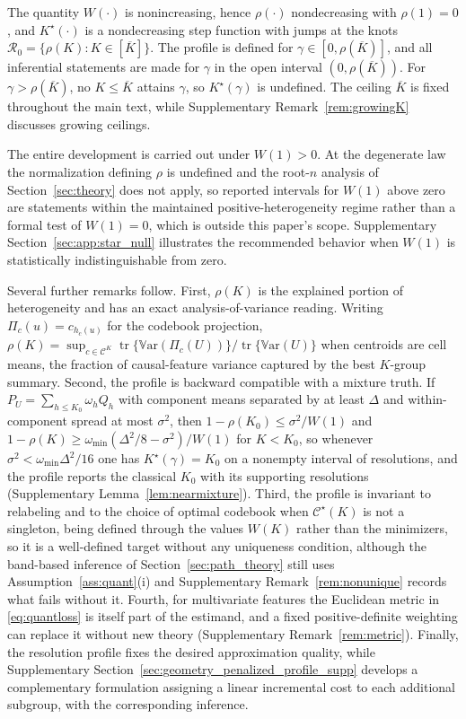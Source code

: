 \documentclass[11pt]{article}
\newcommand{\Var}{\mathbb V\mathrm{ar}}
\newcommand{\tr}{\operatorname{tr}}
\newcommand{\calC}{\mathcal C}
\begin{document}
The quantity $W(\cdot)$ is nonincreasing, hence $\rho(\cdot)$ nondecreasing with $\rho(1)=0$, and $K^\star(\cdot)$ is a nondecreasing step function with jumps at the knots $\mathcal R_0=\{\rho(K):K\in[\overline K]\}$. The profile is defined for $\gamma\in[0,\rho(\overline K)]$, and all inferential statements are made for $\gamma$ in the open interval $(0,\rho(\overline K))$. For $\gamma>\rho(\overline K)$, no $K\le\overline K$ attains $\gamma$, so $K^\star(\gamma)$ is undefined. The ceiling $\overline K$ is fixed throughout the main text, while Supplementary Remark~\ref{rem:growingK} discusses growing ceilings.

The entire development is carried out under $W(1)>0$. At the degenerate law the normalization defining $\rho$ is undefined and the root-$n$ analysis of Section~\ref{sec:theory} does not apply, so reported intervals for $W(1)$ above zero are statements within the maintained positive-heterogeneity regime rather than a formal test of $W(1)=0$, which is outside this paper's scope. Supplementary Section~\ref{sec:app:star_null} illustrates the recommended behavior when $W(1)$ is statistically indistinguishable from zero.


Several further remarks follow. First, $\rho(K)$ is the explained portion of heterogeneity and has an exact analysis-of-variance reading. Writing $\Pi_c(u)=c_{h_c(u)}$ for the codebook projection, $\rho(K)=\sup_{c\in\calC^K}\tr\{\Var(\Pi_c(U))\}/\tr\{\Var(U)\}$ when centroids are cell means, the fraction of causal-feature variance captured by the best $K$-group summary. Second, the profile is backward compatible with a mixture truth. If $P_U=\sum_{h\le K_0}\omega_h Q_h$ with component means separated by at least $\Delta$ and within-component spread at most $\sigma^2$, then $1-\rho(K_0)\le\sigma^2/W(1)$ and $1-\rho(K)\ge\omega_{\min}(\Delta^2/8-\sigma^2)/W(1)$ for $K<K_0$, so whenever $\sigma^2<\omega_{\min}\Delta^2/16$ one has $K^\star(\gamma)=K_0$ on a nonempty interval of resolutions, and the profile reports the classical $K_0$ with its supporting resolutions (Supplementary Lemma~\ref{lem:nearmixture}). Third, the profile is invariant to relabeling and to the choice of optimal codebook when $\calC^\star(K)$ is not a singleton, being defined through the values $W(K)$ rather than the minimizers, so it is a well-defined target without any uniqueness condition, although the band-based inference of Section~\ref{sec:path_theory} still uses Assumption~\ref{ass:quant}\textup{(i)} and Supplementary Remark~\ref{rem:nonunique} records what fails without it. Fourth, for multivariate features the Euclidean metric in \eqref{eq:quantloss} is itself part of the estimand, and a fixed positive-definite weighting can replace it without new theory (Supplementary Remark~\ref{rem:metric}). Finally, the resolution profile fixes the desired approximation quality, while Supplementary Section~\ref{sec:geometry_penalized_profile_supp} develops a complementary formulation assigning a linear incremental cost to each additional subgroup, with the corresponding inference.
\end{document}
